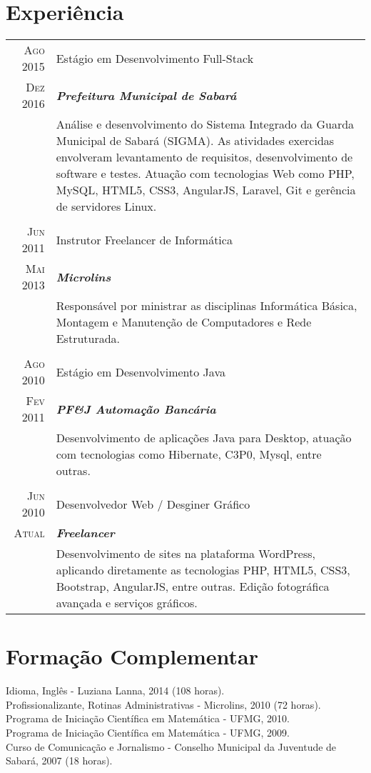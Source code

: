 \documentclass[a4paper,10pt]{article}
\begin{document}
\section{Experiência}
\begin{tabular}{r|p{13.1cm}}
	\textsc{Ago 2015} & Estágio em Desenvolvimento Full-Stack \\
	\textsc{Dez 2016}&\emph{\textbf{Prefeitura Municipal de Sabará}}\\
		 &\footnotesize{Análise e desenvolvimento do Sistema Integrado da Guarda Municipal de Sabará (SIGMA). As atividades exercidas envolveram levantamento de requisitos, desenvolvimento de software e testes. Atuação com tecnologias Web como PHP, MySQL, HTML5, CSS3, AngularJS, Laravel, Git e gerência de servidores Linux.}\\
	\multicolumn{2}{c}{} \\
	\textsc{Jun 2011} & Instrutor Freelancer de Informática \\
	\textsc{Mai 2013} & \emph{\textbf{Microlins}}\\
		 &\footnotesize{Responsável por ministrar as disciplinas Informática Básica, Montagem e Manutenção de Computadores e Rede Estruturada.}\\
	\multicolumn{2}{c}{} \\
	\textsc{Ago 2010} & Estágio em Desenvolvimento Java\\
	\textsc{Fev 2011}&\emph{\textbf{PF\&J Automação Bancária}}\\
		& \footnotesize{Desenvolvimento de aplicações Java para Desktop, atuação com tecnologias como Hibernate, C3P0, Mysql, entre outras.}\\
	\multicolumn{2}{c}{} \\
	\textsc{Jun 2010} & Desenvolvedor Web / Desginer Gráfico\\
		\textsc{Atual}&\emph{\textbf{Freelancer}}\\
		&\footnotesize{Desenvolvimento de sites na plataforma WordPress, aplicando diretamente as tecnologias PHP, HTML5, CSS3, Bootstrap, AngularJS, entre outras. Edição fotográfica avançada e serviços gráficos.}\\
\end{tabular}

\section{Formação Complementar}
Idioma, Inglês - Luziana Lanna, \textsc{2014} (108 horas).\\
Profissionalizante, Rotinas Administrativas - Microlins, \textsc{2010} (72 horas).\\
Programa de Iniciação Científica em Matemática - UFMG, 2010.\\
Programa de Iniciação Científica em Matemática - UFMG, 2009.\\
Curso de Comunicação e Jornalismo - Conselho Municipal da Juventude de Sabará, 2007 (18 horas).
\end{document}
